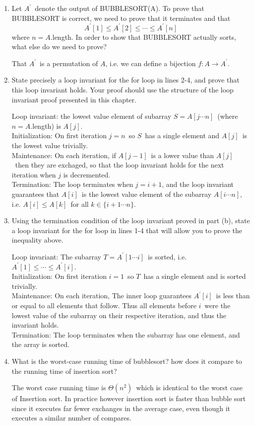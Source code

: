 \documentclass{article}
\newcommand{\?}{\stackrel{?}{=}}
\newcommand\Ans[2][]{%
   \leavevmode\noindent
   {
       \begin{mdframed}[backgroundcolor=blue!10]
       #2
       \end{mdframed}
   }
}
\begin{document}
    \begin{enumerate}
    	\item Let $A^\prime$\ denote the output of BUBBLESORT(A).  To prove that BUBBLESORT is correct, we need to prove that it terminates and that 
    	\[A^\prime[1] \leq A^\prime[2] \leq \cdots \leq A^\prime[n] \]
    	where $n = A.$length.  In order to show that BUBBLESORT actually sorts, what else do we need to prove?
    	\Ans{That $A^\prime$\ is a permutation of $A$, i.e. we can define a bijection $f:A\to A^\prime$. }
    	\item State precisely a loop invariant for the for loop in lines 2-4, and prove that this loop invariant holds.  Your proof should use the structure of the loop invariant proof presented in this chapter.
    	\Ans{
    		Loop invariant: the lowest value element of subarray $S=A[j\cdots n]$\ (where $n=A.$length) is $A[j]$.\\
    		Initialization:  On first iteration $j=n$\ so $S$\ has a single element and $A[j]$\ is the lowest value trivially. \\
    		Maintenance: On each iteration, if $A[j-1]$\ is a lower value than $A[j]$\ then they are exchaged, so that the loop invariant holds for the next iteration when $j$ is decremented. \\
    		Termination: The loop terminates when $j=i+1$, and the loop invariant guarantees that $A[i]$\ is the lowest value element of the subarray $A[i\cdots n]$, i.e. $A[i] \leq A[k]$\ for all $k\in \{i+1\cdots n\}$.
    	}
    	\item Using the termination condition of the loop invariant proved in part (b), state a loop invariant for the for loop in lines 1-4 that will allow you to prove the inequality above.
    	\Ans{
    		Loop invariant: The subarray $T=A^\prime[1\cdots i]$\ is sorted, i.e. $A^\prime[1]\leq \cdots \leq A^\prime[i]$.\\
    	    Initialization: On first iteration $i=1$\ so $T$\ has a single element and is sorted trivially. \\
    	    Maintenance: On each iteration, The inner loop guarantees $A^\prime[i]$\ is less than or equal to all elements that follow.  Thus all elements before $i$\ were the lowest value of the subarray on their respective iteration, and thus the invariant holds. \\
    	    Termination: The loop terminates when the subarray has one element, and the array is sorted. }
    	\item What is the worst-case running time of bubblesort?  how does it compare to the running time of insertion sort?
    	\Ans{The worst case running time is $\Theta(n^2)$\ which is identical to the worst case of Insertion sort. In practice however insertion sort is faster than bubble sort since it executes far fewer exchanges in the average case, even though it executes a similar number of compares.}
    \end{enumerate}
    \newpage
\end{document}

